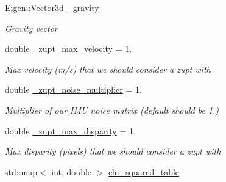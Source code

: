 \begin{DoxyCompactItemize}
\mbox{\label{classov__msckf_1_1UpdaterZeroVelocity_aa0bd3b68624d85a6e9db27a1d1631486}} 
Eigen\+::\+Vector3d \hyperlink{classov__msckf_1_1UpdaterZeroVelocity_aa0bd3b68624d85a6e9db27a1d1631486}{\+\_\+gravity}
\begin{DoxyCompactList}\small\item\em Gravity vector \end{DoxyCompactList}\item 
\mbox{\label{classov__msckf_1_1UpdaterZeroVelocity_a27800e861318dfd8938005dc8b7507cf}} 
double \hyperlink{classov__msckf_1_1UpdaterZeroVelocity_a27800e861318dfd8938005dc8b7507cf}{\+\_\+zupt\+\_\+max\+\_\+velocity} = 1.
\begin{DoxyCompactList}\small\item\em Max velocity (m/s) that we should consider a zupt with \end{DoxyCompactList}\item 
\mbox{\label{classov__msckf_1_1UpdaterZeroVelocity_a4cb7aba647c32c927075fbffd7573b5e}} 
double \hyperlink{classov__msckf_1_1UpdaterZeroVelocity_a4cb7aba647c32c927075fbffd7573b5e}{\+\_\+zupt\+\_\+noise\+\_\+multiplier} = 1.
\begin{DoxyCompactList}\small\item\em Multiplier of our I\+MU noise matrix (default should be 1.) \end{DoxyCompactList}\item 
\mbox{\label{classov__msckf_1_1UpdaterZeroVelocity_a2ef8c37273e0159bd83cc34cccce1099}} 
double \hyperlink{classov__msckf_1_1UpdaterZeroVelocity_a2ef8c37273e0159bd83cc34cccce1099}{\+\_\+zupt\+\_\+max\+\_\+disparity} = 1.
\begin{DoxyCompactList}\small\item\em Max disparity (pixels) that we should consider a zupt with \end{DoxyCompactList}\item 
\mbox{\label{classov__msckf_1_1UpdaterZeroVelocity_a5b6c97d5985ae971821aaeaed715e717}} 
std\+::map$<$ int, double $>$ \hyperlink{classov__msckf_1_1UpdaterZeroVelocity_a5b6c97d5985ae971821aaeaed715e717}{chi\+\_\+squared\+\_\+table}

\end{DoxyCompactItemize}
